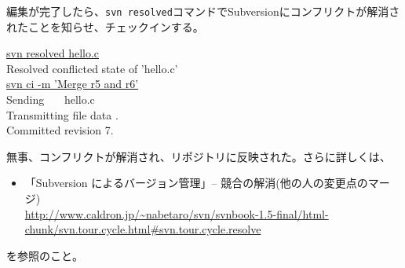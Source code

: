 編集が完了したら、{\tt svn resolved}コマンドでSubversionにコンフリクトが解消されたことを知らせ、チェックインする。
\begin{commandline2}
\prompt \underline{svn resolved hello.c} \\
Resolved conflicted state of 'hello.c' \\
\prompt \underline{svn ci -m 'Merge r5 and r6'} \\
Sending \ \ \ hello.c \\
Transmitting file data . \\
Committed revision 7.
\end{commandline2} \noindent
無事、コンフリクトが解消され、リポジトリに反映された。さらに詳しくは、
\begin{itemize}
  \item 「Subversion によるバージョン管理」-- 競合の解消(他の人の変更点のマージ) \\
    {\footnotesize \url{http://www.caldron.jp/~nabetaro/svn/svnbook-1.5-final/html-chunk/svn.tour.cycle.html#svn.tour.cycle.resolve}}
\end{itemize}
を参照のこと。
  

